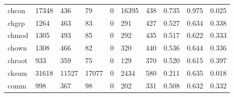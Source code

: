 \begin{longtable}{lp{1.3cm}p{1.3cm}p{1.3cm}p{1.3cm}p{1.3cm}p{1.3cm}p{1.3cm}p{1.3cm}p{1.3cm}}
chcon     &                  17348 &                                436 &                                79 &                                0 &                             16395 &                             438 &                                   0.735 &                                  0.975 &                                0.025 \\
chgrp     &                   1264 &                                463 &                                83 &                                0 &                               291 &                             427 &                                   0.527 &                                  0.634 &                                0.338 \\
chmod     &                   1305 &                                493 &                                85 &                                0 &                               292 &                             435 &                                   0.517 &                                  0.622 &                                0.333 \\
chown     &                   1308 &                                466 &                                82 &                                0 &                               320 &                             440 &                                   0.536 &                                  0.644 &                                0.336 \\
chroot    &                    933 &                                359 &                                75 &                                0 &                               129 &                             370 &                                   0.520 &                                  0.615 &                                0.397 \\
cksum     &                  31618 &                              11527 &                             17077 &                                0 &                              2434 &                             580 &                                   0.211 &                                  0.635 &                                0.018 \\
comm      &                    998 &                                367 &                                98 &                                0 &                               202 &                             331 &                                   0.508 &                                  0.632 &                                0.332 \\

\end{longtable}
